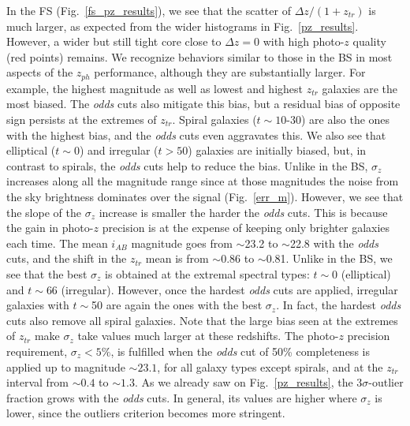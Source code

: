 In the FS (Fig.~\ref{fs_pz_results}), we see that the scatter of $\Delta z/(1+z_{tr})$ is much larger, as expected from the wider histograms in Fig.~\ref{pz_results}. However, a wider but still tight core close to $\Delta z = 0$ with high photo-$z$ quality (red points) remains. We recognize behaviors similar to those in the BS in most aspects of the $z_{ph}$ performance, although they are substantially larger. For example, the highest magnitude as well as lowest and highest $z_{tr}$ galaxies are the most biased. The \textit{odds} cuts also mitigate this bias, but a residual bias of opposite sign persists at the extremes of $z_{tr}$. Spiral galaxies ($t\sim10$-$30$) are also the ones with the highest bias, and the \textit{odds} cuts even aggravates this. We also see that elliptical ($t\sim0$) and irregular ($t>50$) galaxies are initially biased, but, in contrast to spirals, the \textit{odds} cuts help to reduce the bias. Unlike in the BS, $\sigma_z$ increases along all the magnitude range since at those magnitudes the noise from the sky brightness dominates over the signal (Fig.~\ref{err_m}). However, we see that the slope of the $\sigma_z$ increase is smaller the harder the \textit{odds} cuts. This is because the gain in photo-$z$ precision is at the expense of keeping only brighter galaxies each time. The mean $i_{AB}$ magnitude goes from $\sim$23.2 to $\sim$22.8 with the \textit{odds} cuts, and the shift in the $z_{tr}$ mean is from $\sim$0.86 to $\sim$0.81. Unlike in the BS, we see that the best $\sigma_z$ is obtained at the extremal spectral types: $t\sim0$ (elliptical) and $t\sim66$ (irregular). However, once the hardest \textit{odds} cuts are applied, irregular galaxies with $t\sim$50 are again the ones with the best $\sigma_z$. In fact, the hardest \textit{odds} cuts also remove all spiral galaxies. Note that the large bias seen at the extremes of $z_{tr}$ make $\sigma_z$ take values much larger at these redshifts. The photo-$z$ precision requirement, $\sigma_z<5\%$, is fulfilled when the \textit{odds} cut of 50\% completeness is applied up to magnitude $\sim23.1$, for all galaxy types except spirals, and at the $z_{tr}$ interval from $\sim0.4$ to $\sim1.3$. As we already saw on Fig.~\ref{pz_results}, the $3\sigma$-outlier fraction grows with the \textit{odds} cuts. In general, its values are higher where $\sigma_z$ is lower, since the outliers criterion becomes more stringent.
